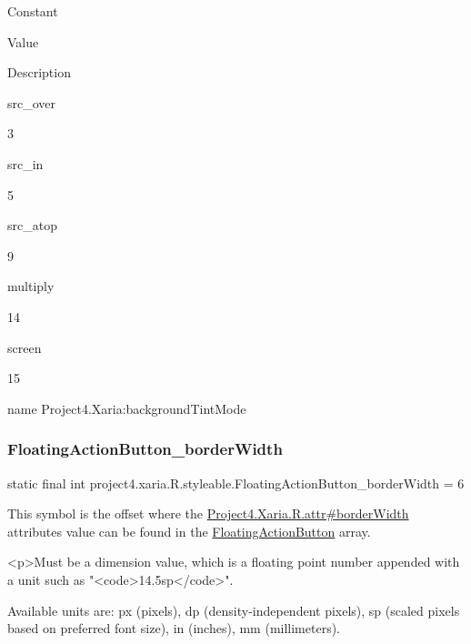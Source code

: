 Constant

Value

Description 

{\ttfamily src\+\_\+over}

3

{\ttfamily src\+\_\+in}

5

{\ttfamily src\+\_\+atop}

9

{\ttfamily multiply}

14

{\ttfamily screen}

15

name Project4.\+Xaria\+:background\+Tint\+Mode \mbox{\label{classproject4_1_1xaria_1_1R_1_1styleable_a670df91ac65db7bb060f28a69c8c2ce1}} 
\subsubsection{\texorpdfstring{Floating\+Action\+Button\+\_\+border\+Width}{FloatingActionButton\_borderWidth}}
{\footnotesize\ttfamily static final int project4.\+xaria.\+R.\+styleable.\+Floating\+Action\+Button\+\_\+border\+Width = 6\hspace{0.3cm}{\ttfamily [static]}}

This symbol is the offset where the \hyperlink{}{Project4.\+Xaria.\+R.\+attr\#border\+Width} attribute\textquotesingle{}s value can be found in the \hyperlink{classproject4_1_1xaria_1_1R_1_1styleable_afccbd80ac1ce5fd6f7a9ee0a1b546322}{Floating\+Action\+Button} array.

\begin{DoxyVerb}      <p>Must be a dimension value, which is a floating point number appended with a unit such as "<code>14.5sp</code>".
\end{DoxyVerb}
 Available units are\+: px (pixels), dp (density-\/independent pixels), sp (scaled pixels based on preferred font size), in (inches), mm (millimeters). 

